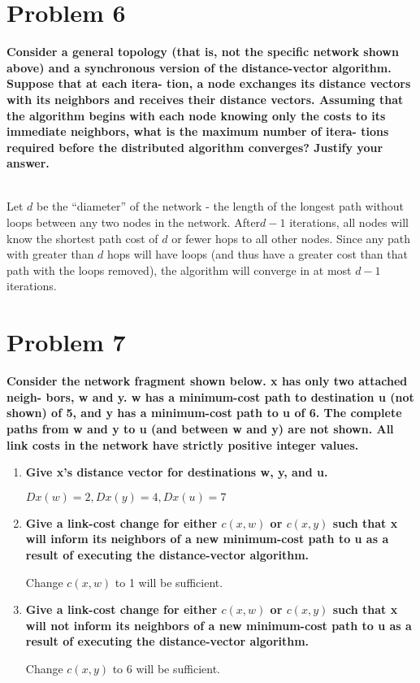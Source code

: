 \documentclass[11pt]{article}
\newenvironment{qparts}{\begin{enumerate}[{(}a{)}]}{\end{enumerate}}
\begin{document}
\newpage
\section{Problem 6}

\textbf{Consider a general topology (that is, not the specific network shown above) and a synchronous version of the distance-vector algorithm. Suppose that at each itera- tion, a node exchanges its distance vectors with its neighbors and receives their distance vectors. Assuming that the algorithm begins with each node knowing only the costs to its immediate neighbors, what is the maximum number of itera- tions required before the distributed algorithm converges? Justify your answer.}

~\\

Let $d$ be the “diameter” of the network - the length of the longest path without loops between any two nodes in the network. After$d −1$ iterations, all nodes will know the shortest path cost of $d$ or fewer hops to all other nodes. Since any path with greater than $d$ hops will have loops (and thus have a greater cost than that path with the loops removed), the algorithm will converge in at most $d −1$ iterations.
 



\newpage
\section{Problem 7}

\textbf{Consider the network fragment shown below. x has only two attached neigh- bors, w and y. w has a minimum-cost path to destination u (not shown) of 5, and y has a minimum-cost path to u of 6. The complete paths from w and y to u (and between w and y) are not shown. All link costs in the network have strictly positive integer values.}

\begin{qparts}

	\item \textbf{Give x’s distance vector for destinations w, y, and u.}
	
	$Dx(w) = 2, Dx(y) = 4, Dx(u) = 7$
	
	\item \textbf{Give a link-cost change for either $c(x,w)$ or $c(x,y)$ such that x will inform its neighbors of a new minimum-cost path to u as a result of executing the distance-vector algorithm.}

	Change $c(x,w)$ to 1 will be sufficient.
	
	\item \textbf{Give a link-cost change for either $c(x,w)$ or $c(x,y)$ such that x will not inform its neighbors of a new minimum-cost path to u as a result of executing the distance-vector algorithm.}

	Change $c(x,y)$ to 6 will be sufficient.

\end{qparts}
\end{document}
